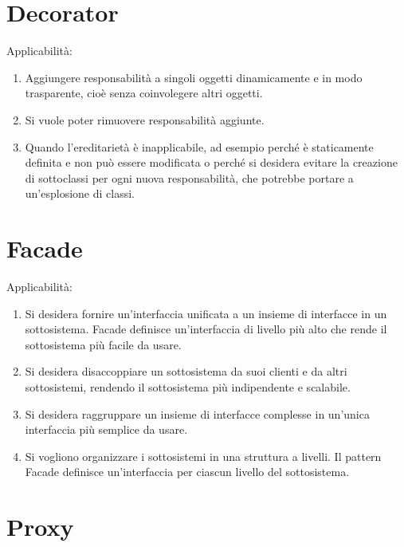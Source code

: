 \documentclass[12pt]{article}
\begin{document}
\section{Decorator}

Applicabilità:
\begin{enumerate}
	\item Aggiungere responsabilità a singoli oggetti dinamicamente e in modo
	      trasparente, cioè senza coinvolegere altri oggetti.

	\item Si vuole poter rimuovere responsabilità aggiunte.

	\item Quando l'ereditarietà è inapplicabile, ad esempio perché è
	      staticamente definita e non può essere modificata o perché si
	      desidera evitare la creazione di sottoclassi per ogni nuova
	      responsabilità, che potrebbe portare a un'esplosione di classi.
\end{enumerate}

\section{Facade}

Applicabilità:
\begin{enumerate}
	\item Si desidera fornire un'interfaccia unificata a un insieme di interfacce
	      in un sottosistema. Facade definisce un'interfaccia di livello più
	      alto che rende il sottosistema più facile da usare.

	\item Si desidera disaccoppiare un sottosistema da suoi clienti e da altri
	      sottosistemi, rendendo il sottosistema più indipendente e
	      scalabile.

	\item Si desidera raggruppare un insieme di interfacce complesse in un'unica
	      interfaccia più semplice da usare.

	\item Si vogliono organizzare i sottosistemi in una struttura a livelli. Il
	      pattern Facade definisce un'interfaccia per ciascun livello del
	      sottosistema.
\end{enumerate}

\section{Proxy}
\end{document}
